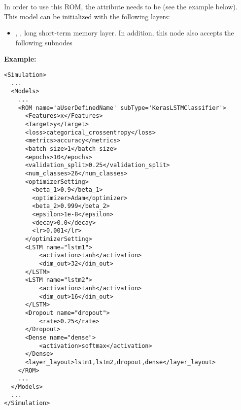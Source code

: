 
In order to use this ROM, the  attribute  needs to
be  (see the example below). This model can be initialized with
the following layers:

\begin{itemize}
  \DenseLayer
  \DropoutLayer
  \item {}, , long short-term memory layer.
    \layerNameAttr
    In addition, this node also accepts the following subnodes
    \begin{itemize}
        \activation
        \dimOut
        \recurrentActivation
        \dropout
        \recurrentDropout
        \returnSequence
        \useBias
        \recurrentInitializer
        \biasInitializer
        \unitForgetBias
        \recurrentRegularizer
        \biasRegularizer
        \activityRegularizer
        \recurrentConstraint
        \biasConstraint
        \implementation
        \returnState
        \goBackwards
        \stateful
        \unroll
    \end{itemize}
\end{itemize}

\textbf{Example:}
\begin{lstlisting}[style=XML,morekeywords={name,subType}]
<Simulation>
  ...
  <Models>
    ...
    <ROM name='aUserDefinedName' subType='KerasLSTMClassifier'>
      <Features>x</Features>
      <Target>y</Target>
      <loss>categorical_crossentropy</loss>
      <metrics>accuracy</metrics>
      <batch_size>1</batch_size>
      <epochs>10</epochs>
      <validation_split>0.25</validation_split>
      <num_classes>26</num_classes>
      <optimizerSetting>
        <beta_1>0.9</beta_1>
        <optimizer>Adam</optimizer>
        <beta_2>0.999</beta_2>
        <epsilon>1e-8</epsilon>
        <decay>0.0</decay>
        <lr>0.001</lr>
      </optimizerSetting>
      <LSTM name="lstm1">
          <activation>tanh</activation>
          <dim_out>32</dim_out>
      </LSTM>
      <LSTM name="lstm2">
          <activation>tanh</activation>
          <dim_out>16</dim_out>
      </LSTM>
      <Dropout name="dropout">
          <rate>0.25</rate>
      </Dropout>
      <Dense name="dense">
          <activation>softmax</activation>
      </Dense>
      <layer_layout>lstm1,lstm2,dropout,dense</layer_layout>
    </ROM>
    ...
  </Models>
  ...
</Simulation>
\end{lstlisting}

